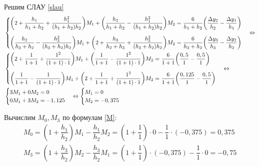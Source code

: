 \documentclass[a4paper, 12pt]{article}
\begin{document}
	Решим СЛАУ \eqref{slau}
	\begin{equation*}
		\begin{aligned}
		&\begin{cases}
			\bigg(2+\dfrac{h_1}{h_1+h_2}+\dfrac{h_1^2}{(h_1+h_2)h_2}\bigg)M_1 + \bigg(\dfrac{h_2}{h_1+h_2}-\dfrac{h_1^2}{(h_1+h_2)h_2}\bigg)M_2 = 
			\dfrac{6}{h_1+h_2}\bigg(\dfrac{\Delta y_2}{h_2}-\dfrac{\Delta y_1}{h_1}\bigg) \vspace{1em} \\ 
			\bigg(\dfrac{h_{2}}{h_{3}+h_{2}}-\dfrac{h_3^2}{(h_3+h_{2})h_{2}}\bigg)M_{1} + \bigg(2+\dfrac{h_3}{h_{2}+h_3}+\dfrac{h_3^2}{(h_3+h_{2})h_{2}}\bigg)M_{2} = 
			\dfrac{6}{h_3+h_{2}}\bigg(\dfrac{\Delta y_3}{h_3}-\dfrac{\Delta y_{2}}{h_{2}}\bigg)\\
		\end{cases}\Leftrightarrow\\
		&\begin{cases}
			\bigg(2+\dfrac{1}{1+1}+\dfrac{1^2}{(1+1)\cdot 1}\bigg)M_1 + \bigg(\dfrac{1}{1+1}-\dfrac{1^2}{(1+1)\cdot 1}\bigg)M_2 = 
			\dfrac{6}{1+1}\bigg(\dfrac{0,5}{1}-\dfrac{0,5}{1}\bigg) \vspace{1em} \\ 				\bigg(\dfrac{1}{1+1}-\dfrac{1}{(1+1)\cdot 1}\bigg)M_{1} + \bigg(2+\dfrac{1}{1+1}+\dfrac{1^2}{(1+1)\cdot 1}\bigg)M_{2} =
			\dfrac{6}{1+1}\bigg(\dfrac{0,125}{1}-\dfrac{0,5}{1}\bigg)
		\end{cases}\Leftrightarrow\\
		&\begin{cases}
			3M_1 + 0M_2 = 
			0 \vspace{0em} \\ 				
			0M_{1} + 3M_{2} =
			-1,125
		\end{cases}\Leftrightarrow
		\begin{cases}
			M_1=0\\
			M_2=-0,375
		\end{cases}
		\end{aligned}
	\end{equation*}

	Вычислим $M_0,M_3$ по формулам \eqref{M}:
	\begin{equation*}
		\begin{gathered}
			M_0=(1+\dfrac{h_1}{h_2})M_1-\dfrac{h_1}{h_2}M_2=(1+\dfrac{1}{1})\cdot 0-\dfrac{1}{1}\cdot(-0,375)=0,375\\
			M_3=(1+\dfrac{h_3}{h_{2}})M_{2}-\dfrac{h_3}{h_{2}}M_{1}=(1+\dfrac{1}{1})\cdot(-0,375)-\dfrac{1}{1}\cdot0=-0,75
		\end{gathered}		
	\end{equation*}
\end{document}
